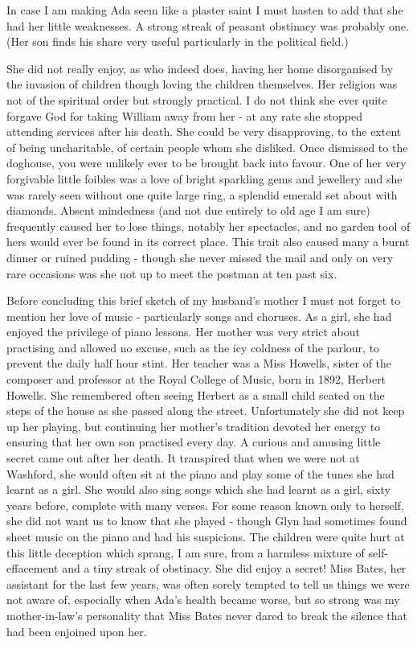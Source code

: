 In case I am making Ada seem like a plaster saint I must hasten to add that she had her little weaknesses. A strong streak of peasant obstinacy was probably one. (Her son finds his share very useful particularly in the political field.)

She did not really enjoy, as who indeed does, having her home disorganised by the invasion of children though loving the children themselves. Her religion was not of the spiritual order but strongly practical. I do not think she ever quite forgave God for taking William away from her - at any rate she stopped attending services after his death. She could be very disapproving, to the extent of being uncharitable, of certain people whom she disliked. Once dismissed to the doghouse, you were unlikely ever to be brought back into favour. One of her very forgivable little foibles was a love of bright sparkling gems and jewellery and she was rarely seen without one quite large ring, a splendid emerald set about with diamonds. Absent mindedness (and not due entirely to old age I am sure) frequently caused her to lose things, notably her spectacles, and no garden tool of hers would ever be found in its correct place. This trait also caused many a burnt dinner or ruined pudding - though she never missed the mail and only on very rare occasions was she not up to meet the postman at ten past six.

Before concluding this brief sketch of my husband's mother I must not forget to mention her love of music - particularly songs and choruses. As a girl, she had enjoyed the privilege of piano lessons. Her mother was very strict about practising and allowed no excuse, such as the icy coldness of the parlour, to prevent the daily half hour stint. Her teacher was a Miss Howells, sister of the composer and professor at the Royal College of Music, born in 1892, Herbert Howells. She remembered often seeing Herbert as a small child seated on the steps of the house as she passed along the street. Unfortunately she did not keep up her playing, but continuing her mother's tradition devoted her energy to ensuring that her own son practised every day. A curious and amusing little secret came out after her death. It transpired that when we were not at Washford, she would often sit at the piano and play some of the tunes she had learnt as a girl. She would also sing songs which she had learnt as a girl, sixty years before, complete with many verses. For some reason known only to herself, she did not want us to know that she played - though Glyn had sometimes found sheet music on the piano and had his suspicions. The children were quite hurt at this little deception which sprang, I am sure, from a harmless mixture of self-effacement and a tiny streak of obstinacy. She did enjoy a secret! Miss Bates, her assistant for the last few years, was often sorely tempted to tell us things we were not aware of, especially when Ada's health became worse, but so strong was my mother-in-law's personality that Miss Bates never dared to break the silence that had been enjoined upon her.

